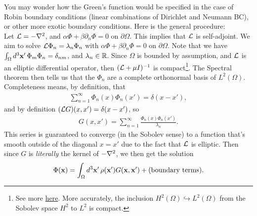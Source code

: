 \documentclass[11pt]{article}
\begin{document}
\begin{reemark}
    You may wonder how the Green's function would be specified in the
    case of Robin boundary conditions (linear combinations of Dirichlet
    and Neumann BC), or other more exotic boundary conditions. Here is the general
    procedure:\\

    \noin
    Let $\mathcal{L} = - \nabla^2$, and $\alpha \Phi + \beta \partial_n \Phi = 0$
    on $\partial \Omega$. This implies that $\mathcal{L}$ is self-adjoint.
    We aim to solve $\mathcal{L} \Phi_n = \lambda_n \Phi_n$ with $\alpha \Phi + \beta \partial_n \Phi = 0$
    on $\partial \Omega$. Note that we have $\int_\Omega d^3\mathbf{x}' \, \Phi_m \Phi_n = \delta_{nm}$,
    and $\lambda_n \in \mathbb{R}$. Since $\Omega$ is bounded by assumption,
    and $\mathcal{L}$ is an elliptic differential operator, then $(\mathcal{L} + \mu I)^{-1}$
    is compact\footnote{See more \href{https://en.wikipedia.org/wiki/Resolvent_formalism?utm_source=chatgpt.com}{here}.
    More accurately, the inclusion $H^2(\Omega) \hookrightarrow L^2(\Omega)$
    from the Sobolev space $H^2$ to $L^2$ is compact.}. 
    The Spectral theorem then tells us that the $\Phi_n$ are a complete
    orthonormal basis of $L^2(\Omega)$. Completeness means, by definition,
    that
    \begin{align*}
        \sum_{n = 1}^\infty \Phi_n(x) \Phi_n(x') = \delta(x - x'),
    \end{align*}
    and by definition $(\mathcal{L} G)(x, x') = \delta(x - x')$, so
    \begin{align*}
        G(x, x') = \sum_{n = 1}^\infty \frac{\Phi_n(x) \Phi_n(x')}{\lambda_n}.
    \end{align*}
    This series is guaranteed to converge (in the Sobolev sense)
    to a function that's smooth outside of the diagonal $x = x'$ due
    to the fact that $\mathcal{L}$ is elliptic. Then since $G$ is \emph{literally}
    the kernel of $- \nabla^2$, we then get the solution
    \begin{align*}
        \Phi(\mathbf{x}) = \int_\Omega d^3\mathbf{x}' \, \rho(\mathbf{x}') G(\mathbf{x}, \mathbf{x}') + (\text{boundary terms}). 
    \end{align*}
\end{reemark}
\end{document}
